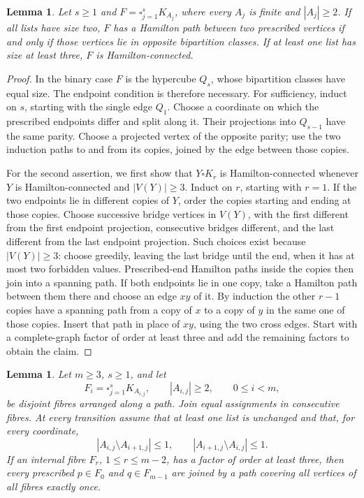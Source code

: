 \documentclass[11pt]{article}
\newtheorem{lemma}[theorem]{Lemma}
\theoremstyle{remark}
\numberwithin{equation}{section}
\numberwithin{table}{section}
\begin{document}
\begin{lemma}
\label{lem:product}
Let $s\ge1$ and $F=\square_{j=1}^s K_{A_j}$, where every $A_j$ is
finite and $|A_j|\ge2$.  If all lists have size two, $F$ has a
Hamilton path between two prescribed vertices if and only if those
vertices lie in opposite bipartition classes.  If at least one list has
size at least three, $F$ is Hamilton-connected.
\end{lemma}

\begin{proof}
In the binary case $F$ is the hypercube $Q_s$, whose bipartition
classes have equal size.  The endpoint condition is therefore necessary.
For sufficiency, induct on $s$, starting with the single edge $Q_1$.
Choose a coordinate on which the prescribed endpoints differ and split
along it.  Their projections into $Q_{s-1}$ have the same parity.  Choose
a projected vertex of the opposite parity; use the two induction paths
to and from its copies, joined by the edge between those copies.

For the second assertion, we first show that $Y\square K_r$ is
Hamilton-connected whenever $Y$ is Hamilton-connected and
$|V(Y)|\ge3$.  Induct on $r$, starting with $r=1$.  If the two
endpoints lie in different copies of $Y$, order the copies starting and
ending at those copies.  Choose successive bridge vertices in $V(Y)$,
with the first different from the first endpoint projection, consecutive
bridges different, and the last different from the last endpoint
projection.  Such choices exist because $|V(Y)|\ge3$: choose greedily,
leaving the last bridge until the end, when it has at most two forbidden
values.  Prescribed-end Hamilton paths inside the copies then join into
a spanning path.  If both endpoints lie in one copy, take a Hamilton
path between them there and choose an edge $xy$ of it.  By induction the
other $r-1$ copies have a spanning path from a copy of $x$ to a copy of
$y$ in the same one of those copies.  Insert that path in place of
$xy$, using the two cross edges.  Start with a complete-graph factor of
order at least three and add the remaining factors to obtain the claim.
\end{proof}

\begin{lemma}
\label{lem:path-fibre}
Let $m\ge3$, $s\ge1$, and let
\[
 F_i=\square_{j=1}^s K_{A_{i,j}},\qquad |A_{i,j}|\ge2,
 \qquad 0\le i<m,
\]
be disjoint fibres arranged along a path.  Join equal assignments in
consecutive fibres.  At every transition assume that at least one list
is unchanged and that, for every coordinate,
\[
 |A_{i,j}\setminus A_{i+1,j}|\le1,
 \qquad |A_{i+1,j}\setminus A_{i,j}|\le1.
\]
If an internal fibre $F_r$, $1\le r\le m-2$, has a factor of order
at least three, then every prescribed $p\in F_0$ and $q\in F_{m-1}$
are joined by a path covering all vertices of all fibres exactly once.
\end{lemma}
\end{document}
